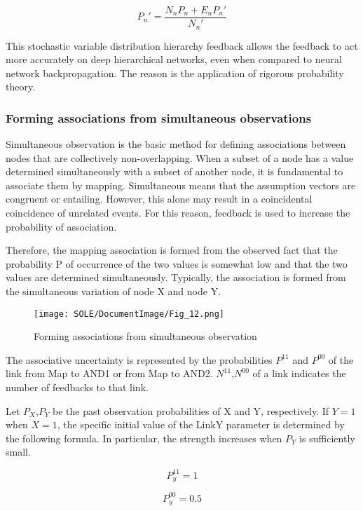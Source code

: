 \documentclass[12pt]{article}
\begin{document}
\[P_n'=\frac{N_{n}P_n +E_nP_n'}{N_{n}'}\]

This stochastic variable distribution hierarchy feedback allows the
feedback to act more accurately on deep hierarchical networks, even when
compared to neural network backpropagation. The reason is the
application of rigorous probability theory.

\subsubsection{Forming associations from simultaneous observations}\label{forming-associations-from-simultaneous-observations}  

Simultaneous observation is the basic method for defining associations
between nodes that are collectively non-overlapping. When a subset of a
node has a value determined simultaneously with a subset of another
node, it is fundamental to associate them by mapping. Simultaneous means
that the assumption vectors are congruent or entailing. However, this
alone may result in a coincidental coincidence of unrelated events. For
this reason, feedback is used to increase the probability of
association.

Therefore, the mapping association is formed from the observed fact that
the probability P of occurrence of the two values is somewhat low and
that the two values are determined simultaneously. Typically, the
association is formed from the simultaneous variation of node X and node
Y.

\begin{figure}[ht]
  \centering
  \texttt{[image: SOLE/DocumentImage/Fig\_12.png]}
  \caption{Forming associations from simultaneous observation}
  \label{fig:forming_associations_from_simultaneous_observation}
\end{figure}

The associative uncertainty is represented by the probabilities
\(P^{11}\) and \(P^{00}\) of the link from Map to AND1 or from Map to
AND2. \(N^{11}\),\(N^{00}\) of a link indicates the number of feedbacks
to that link.

Let \(P_X\),\(P_Y\) be the past observation probabilities of X and Y,
respectively. If \(Y=1\) when \(X=1\), the specific initial value of the
LinkY parameter is determined by the following formula. In particular,
the strength increases when \(P_Y\) is sufficiently small.

\[ P_y^{11}=1\]

\[ P_y^{00}=0.5\]
\end{document}
